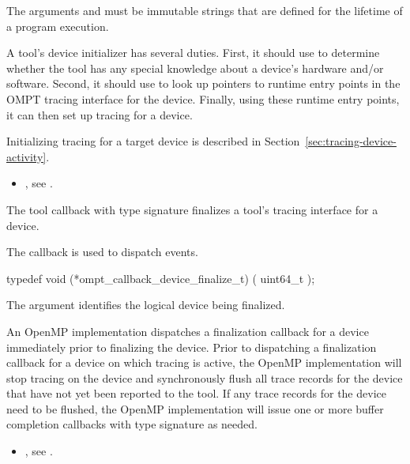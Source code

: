 \constraints
The arguments  and  must be
immutable strings that are defined for the lifetime of a program
execution.

\effect

A tool's device initializer has several duties.  First, it should use
 to determine whether the tool has any special knowledge
about a device's hardware and/or software.  Second, it should use
 to look up pointers to runtime entry points in the OMPT tracing
interface for the device.  Finally, using these runtime entry points, it can
then set up tracing for a device.

Initializing tracing for a target device is described in 
Section~\ref{sec:tracing-device-activity}.

\crossreferences
\begin{itemize}
\item {}, see
  .
\end{itemize}


\label{sec:ompt_callback_device_finalize_t}

\summary The tool callback with type signature
 finalizes a
tool's tracing interface for a device.

The  callback is used to dispatch
 events.

\format

\begin{ccppspecific}
\begin{omptCallback}
typedef void (*ompt_callback_device_finalize_t) (
  uint64_t 
);
\end{omptCallback}
\end{ccppspecific}


\argdesc

The argument  identifies the logical device
being finalized.

\descr

An OpenMP implementation dispatches a finalization callback for a
device immediately prior to finalizing the device. Prior to dispatching
a finalization callback for a device on which tracing is active,
the OpenMP implementation will stop tracing on the device and
synchronously flush all trace records for the device 
that have not yet been reported to the tool. 
If any trace records for the device need to be flushed,
the OpenMP implementation will issue one or more
buffer completion callbacks with type signature 
as needed.

\crossreferences
\begin{itemize}
\item {}, see
  .
\end{itemize}
